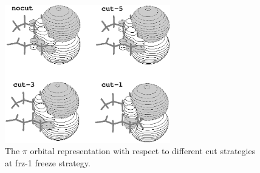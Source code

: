 \begin{center}
\begin{figure}[h!]
\begin{center}
\includegraphics[width=72mm,keepaspectratio]{02_localization/images/7Z-orbitals.eps}
\caption{\footnotesize The $\pi$ orbital representation with respect to different cut strategies at frz-1
freeze strategy. }
\label{fig:7Z-orbitals}
\end{center}
\end{figure}
\end{center}

